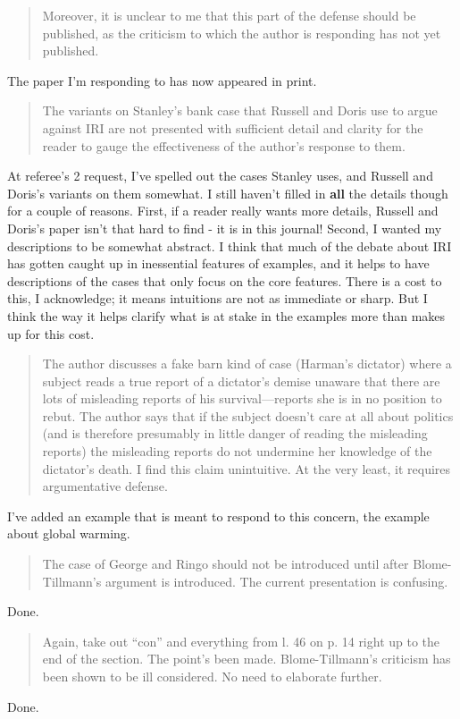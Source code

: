 \documentclass[]{article}
\newcommand{\reviewer}[1]{
\begin{quote}
#1
\end{quote}
\noindent}
\begin{document}
\reviewer{Moreover, it is unclear to me that this part of the defense should be published, as the criticism to which the author is responding has not yet published.}%
The paper I'm responding to has now appeared in print.

\reviewer{The variants on Stanley's bank case that Russell and Doris use to argue against IRI are not presented with sufficient detail and clarity for the reader to gauge the effectiveness of the author's response to them. }%
At referee's 2 request, I've spelled out the cases Stanley uses, and Russell and Doris's variants on them somewhat. I still haven't filled in \textbf{all} the details though for a couple of reasons. First, if a reader really wants more details, Russell and Doris's paper isn't that hard to find - it is in this journal! Second, I wanted my descriptions to be somewhat abstract. I think that much of the debate about IRI has gotten caught up in inessential features of examples, and it helps to have descriptions of the cases that only focus on the core features. There is a cost to this, I acknowledge; it means intuitions are not as immediate or sharp. But I think the way it helps clarify what is at stake in the examples more than makes up for this cost.

\reviewer{The author discusses a fake barn kind of case (Harman's dictator) where a subject reads a true report of a dictator's demise unaware that there are lots of misleading reports of his survival---reports she is in no position to rebut.  The author says that if the subject doesn't care at all about politics (and is therefore presumably in little danger of reading the misleading reports) the misleading reports do not undermine her knowledge of the dictator's death.  I find this claim unintuitive.  At the very least, it requires argumentative defense.}%
I've added an example that is meant to respond to this concern, the example about global warming.

\newpage
\reviewer{The case of George and Ringo should not be introduced until after Blome-Tillmann's argument is introduced.  The current presentation is confusing.}%
Done.

\reviewer{Again, take out ``con'' and everything from l. 46 on p. 14 right up to the end of the section.  The point's been made.  Blome-Tillmann's criticism has been shown to be ill considered.  No need to elaborate further.}
Done.
\end{document}
